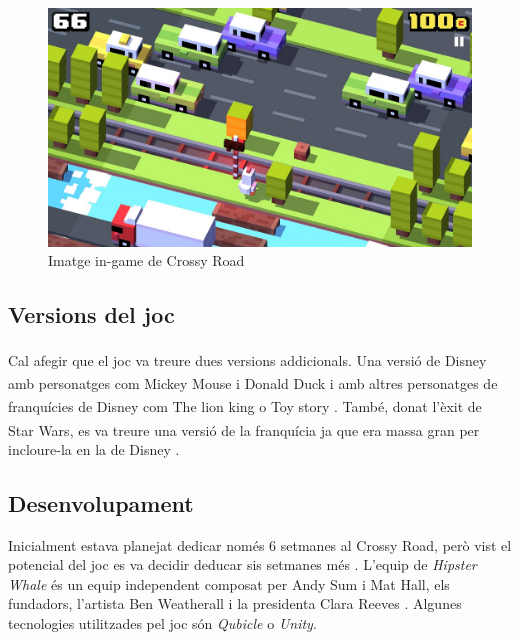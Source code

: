 \documentclass{article}
\begin{document}
\begin{figure}
	\includegraphics[width=\linewidth]{CrossyRoadGameplay.jpg}
	\caption{Imatge in-game de Crossy Road}
	\label{inGame}
\end{figure}

\subsection{Versions del joc}

Cal afegir que el joc va treure dues versions addicionals. Una versió de
Disney\textsuperscript{\textregistered} amb personatges com Mickey Mouse\textsuperscript{\texttrademark} i
Donald Duck\textsuperscript{\texttrademark} i amb altres personatges
de franquícies de Disney com The lion king\textsuperscript{\texttrademark}
o Toy story\textsuperscript{\texttrademark} \cite{disneyCrossy}. També,
donat l'èxit de Star Wars\textsuperscript{\texttrademark}, es va treure
una versió de la franquícia ja que era massa gran per incloure-la en
la de Disney \cite{starWarsCrossy}. \newline

\subsection{Desenvolupament}

Inicialment estava planejat dedicar només 6 setmanes al Crossy Road, però vist el
potencial del joc es va decidir deducar sis setmanes més \cite{delayedCrossy}. L'equip
de \textit{Hipster Whale} és un equip independent composat per Andy Sum i Mat Hall, els
fundadors, l'artista Ben Weatherall i la presidenta Clara Reeves \cite{HipsterPressKit}.
Algunes tecnologies utilitzades pel joc són \textit{Qubicle} \cite{qubicle} \cite{crossyPressKit} o \textit{Unity}.
\end{document}
